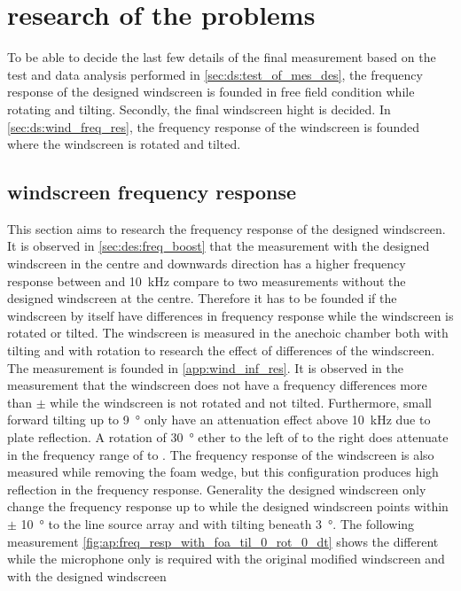 
      
            
\section{research of the problems}
To be able to decide the last few details of the final measurement based on the test and data analysis performed in \autoref{sec:ds:test_of_mes_des}, the frequency response of the designed windscreen is founded in free field condition while rotating and tilting. Secondly, the final windscreen hight is decided. In \autoref{sec:ds:wind_freq_res}, the frequency response of the windscreen is founded where the windscreen is rotated and tilted. 

\subsection{windscreen frequency response}\label{sec:ds:wind_freq_res}
This section aims to research the frequency response of the designed windscreen. It is observed in \autoref{sec:des:freq_boost} that the measurement with the designed windscreen in the centre and downwards direction has a higher frequency response between  and \SI{10}{\kilo\hertz} compare to two measurements without the designed windscreen at the centre. Therefore it has to be founded if the windscreen by itself have differences in frequency response while the windscreen is rotated or tilted. The windscreen is measured in the anechoic chamber both with tilting and with rotation to research the effect of differences of the windscreen. The measurement is founded in \autoref{app:wind_inf_res}. It is observed in the measurement that the windscreen does not have a frequency differences more than $\pm$ while the windscreen is not rotated and not tilted. Furthermore, small forward tilting up to \SI{9}{\degree} only have an attenuation effect above \SI{10}{\kilo\hertz} due to plate reflection. A rotation of \SI{30}{\degree} ether to the left of to the right does attenuate in the frequency range of  to . The frequency response of the windscreen is also measured while removing the foam wedge, but this configuration produces high reflection in the frequency response. Generality the designed windscreen only change the frequency response up to  while the designed windscreen points within $\pm$ \SI{10}{\degree} to the line source array and with tilting beneath \SI{3}{\degree}. The following measurement \autoref{fig:ap:freq_resp_with_foa_til_0_rot_0_dt} shows the different while the microphone only is required with the original modified windscreen and with the designed windscreen





